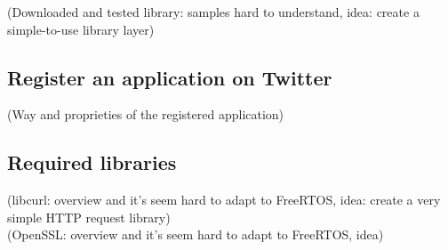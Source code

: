 (Downloaded and tested library: samples hard to understand, idea: create a simple-to-use library layer)


\subsection{Register an application on Twitter}

(Way and proprieties of the registered application)


\subsection{Required libraries}

(libcurl: overview and it's seem hard to adapt to FreeRTOS, idea: create a very simple HTTP request library)\\
(OpenSSL: overview and it's seem hard to adapt to FreeRTOS, idea)



\clearpage